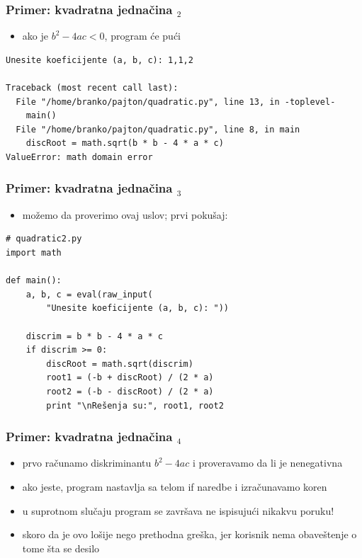 \documentclass[utf8,compress]{beamer}
\begin{document}
\begin{frame}[fragile]
  \frametitle{Primer: kvadratna jednačina $_2$}
  \begin{itemize}
    \item ako je $b^2 - 4ac < 0$, program će pući
  \end{itemize}
\begin{verbatim}
Unesite koeficijente (a, b, c): 1,1,2

Traceback (most recent call last):
  File "/home/branko/pajton/quadratic.py", line 13, in -toplevel-
    main()
  File "/home/branko/pajton/quadratic.py", line 8, in main
    discRoot = math.sqrt(b * b - 4 * a * c)
ValueError: math domain error
\end{verbatim}
\end{frame}

\begin{frame}[fragile]
  \frametitle{Primer: kvadratna jednačina $_3$}
  \begin{itemize}
    \item možemo da proverimo ovaj uslov; prvi pokušaj:
  \end{itemize}
\begin{verbatim}
# quadratic2.py
import math  

def main():
    a, b, c = eval(raw_input(
        "Unesite koeficijente (a, b, c): "))

    discrim = b * b - 4 * a * c
    if discrim >= 0:
        discRoot = math.sqrt(discrim)
        root1 = (-b + discRoot) / (2 * a)
        root2 = (-b - discRoot) / (2 * a)
        print "\nRešenja su:", root1, root2
\end{verbatim}
\end{frame}

\begin{frame}[fragile]
  \frametitle{Primer: kvadratna jednačina $_4$}
  \begin{itemize}
    \item prvo računamo diskriminantu $b^2-4ac$ i proveravamo da li je nenegativna
    \item ako jeste, program nastavlja sa telom if naredbe i izračunavamo koren
    \item u suprotnom slučaju program se završava ne ispisujući nikakvu poruku!
    \item skoro da je ovo lošije nego prethodna greška, jer korisnik nema obaveštenje o tome šta se desilo
  \end{itemize}
\end{frame}
\end{document}
